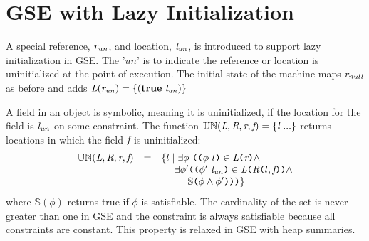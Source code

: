 \section{GSE with Lazy Initialization}

A special reference, $\emph{r}_\mathit{un}$, and location,
$\emph{l}_\mathit{un}$, is introduced to support lazy initialization
in GSE. The '$\mathit{un}$' is to indicate the reference or location
is uninitialized at the point of execution. The initial state of the
machine maps $\emph{r}_\mathit{null}$ as before and adds
$\emph{L}(\emph{r}_\mathit{un}) = \{(\textbf{true}\ \emph{l}_\mathit{un})\}$

A field in an object is symbolic, meaning it is uninitialized, if the
location for the field is $\emph{l}_\mathit{un}$ on some constraint. The function
$\mathbb{UN}(\emph{L}, \emph{R}, \emph{r}, \emph{f}) =
\{\emph{l}\ ...\}$ returns locations in which the field $\emph{f}$
is uninitialized:
\[
\begin{array}{rcl}
\mathbb{UN}(\cfgnt{L}, \cfgnt{R}, \cfgnt{r}, \cfgnt{f}) & = &\{ l \mid \exists \phi\ \lp \lp \phi\ l\rp  \in \cfgnt{L}\lp \cfgnt{r}\rp  \wedge \\
& & \ \ \ \ \exists \phi^\prime \lp \lp \phi^\prime\ \cfgnt{l}_\mathit{un}\rp  \in \cfgnt{L}\lp \cfgnt{R}\lp l,\cfgnt{f}\rp\rp \wedge \\
& & \ \ \ \ \ \ \ \ \mathbb{S}\lp \phi \wedge \phi^\prime \rp\rp\rp\}\\
\end{array}
\]
where $\mathbb{S}(\phi)$ returns true if $\phi$ is satisfiable. The
cardinality of the set is never greater than one in GSE and the
constraint is always satisfiable because all constraints are
constant. This property is relaxed in GSE with heap summaries.




